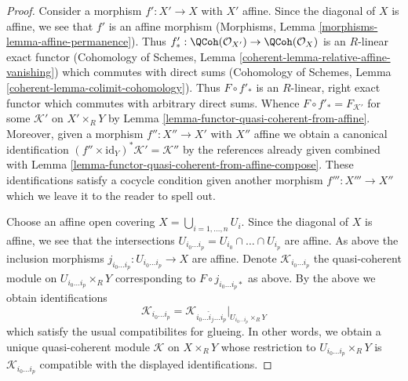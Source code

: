 \begin{proof}
Consider a morphism $f' : X' \to X$ with $X'$ affine. Since the
diagonal of $X$ is affine, we see that $f'$ is an affine morphism
(Morphisms, Lemma \ref{morphisms-lemma-affine-permanence}).
Thus $f'_* : \QCoh(\mathcal{O}_{X'}) \to \QCoh(\mathcal{O}_X)$
is an $R$-linear exact functor
(Cohomology of Schemes, Lemma \ref{coherent-lemma-relative-affine-vanishing})
which commutes with direct sums
(Cohomology of Schemes, Lemma \ref{coherent-lemma-colimit-cohomology}).
Thus $F \circ f'_*$ is an $R$-linear, right exact functor which commutes
with arbitrary direct sums. Whence
$F \circ f'_* = F_{\mathcal{K}'}$ for some $\mathcal{K}'$
on $X' \times_R Y$ by Lemma \ref{lemma-functor-quasi-coherent-from-affine}.
Moreover, given a morphism $f'' : X'' \to X'$ with $X''$ affine
we obtain a canonical identification
$(f'' \times \text{id}_Y)^*\mathcal{K}' = \mathcal{K}''$
by the references already given combined with
Lemma \ref{lemma-functor-quasi-coherent-from-affine-compose}.
These identifications satisfy a cocycle condition given
another morphism $f''' : X''' \to X''$ which we leave it to
the reader to spell out.

\medskip\noindent
Choose an affine open covering $X = \bigcup_{i = 1, \ldots, n} U_i$.
Since the diagonal of $X$ is affine, we see that the intersections
$U_{i_0 \ldots i_p} = U_{i_0} \cap \ldots \cap U_{i_p}$ are affine.
As above the inclusion morphisms
$j_{i_0 \ldots i_p} : U_{i_0 \ldots i_p} \to X$ are affine.
Denote $\mathcal{K}_{i_0 \ldots i_p}$ the quasi-coherent module
on $U_{i_0 \ldots i_p} \times_R Y$ corresponding to
$F \circ j_{i_0 \ldots i_p *}$ as above.
By the above we obtain identifications
$$
\mathcal{K}_{i_0 \ldots i_p} =
\mathcal{K}_{i_0 \ldots \hat i_j \ldots i_p}|_{U_{i_0 \ldots i_p} \times_R Y}
$$
which satisfy the usual compatibilites for glueing. In other words, we obtain
a unique quasi-coherent module $\mathcal{K}$ on $X \times_R Y$
whose restriction to $U_{i_0 \ldots i_p} \times_R Y$ is
$\mathcal{K}_{i_0 \ldots i_p}$ compatible with the displayed identifications.


\end{proof}
